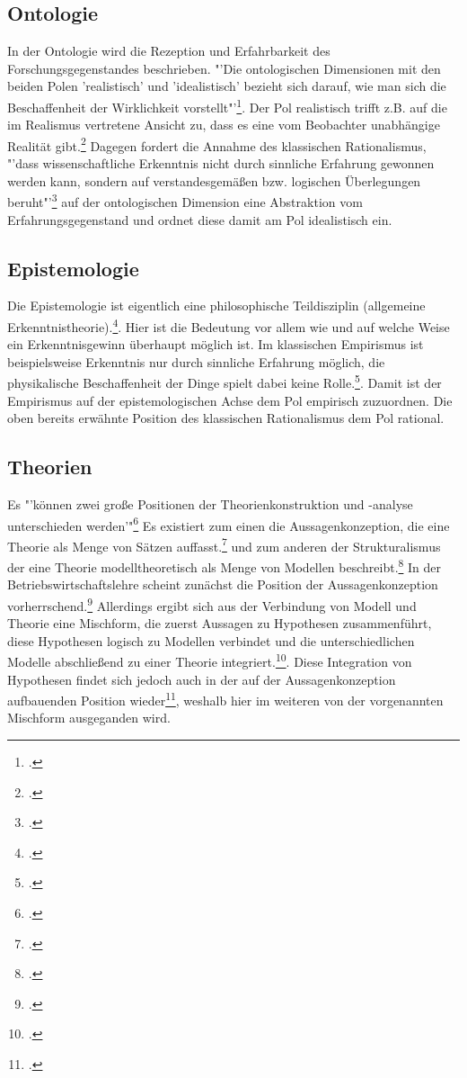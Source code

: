 \documentclass[a4paper,12pt]{article}
\begin{document}
\subsection{Ontologie}
In der Ontologie wird die Rezeption und Erfahrbarkeit des Forschungsgegenstandes beschrieben. "'Die ontologischen Dimensionen mit den beiden Polen 'realistisch' und 'idealistisch' bezieht sich darauf, wie man sich die Beschaffenheit  der Wirklichkeit vorstellt"'\footcite[S. 94]{Helfrich2024}. Der Pol realistisch trifft z.B. auf die im Realismus vertretene Ansicht zu, dass es eine vom Beobachter unabhängige Realität gibt.\footcite[S. 95]{Helfrich2024} Dagegen fordert die Annahme des klassischen Rationalismus, "'dass wissenschaftliche Erkenntnis nicht durch sinnliche Erfahrung gewonnen werden kann, sondern auf verstandesgemäßen bzw. logischen Überlegungen beruht"'\footcite[S. 100]{Helfrich2024} auf der ontologischen Dimension eine Abstraktion vom Erfahrungsgegenstand und ordnet diese damit am Pol idealistisch ein.
\subsection{Epistemologie}
Die Epistemologie ist eigentlich eine philosophische Teildisziplin (allgemeine Erkenntnistheorie).\footcite[S. 1]{Helfrich2024}. Hier ist die Bedeutung vor allem wie und auf welche Weise ein Erkenntnisgewinn überhaupt möglich ist. Im klassischen Empirismus ist beispielsweise Erkenntnis nur durch sinnliche Erfahrung möglich, die physikalische Beschaffenheit der Dinge spielt dabei keine Rolle.\footcite[S. 98]{Helfrich2024}. Damit ist der Empirismus auf der epistemologischen Achse dem Pol empirisch zuzuordnen. Die oben bereits erwähnte Position des klassischen Rationalismus dem Pol rational.
\subsection{Theorien}
Es "'können zwei große Positionen der Theorienkonstruktion und -analyse unterschieden werden'"\footcite[S. 100]{Kornmesser2020} Es existiert zum einen die Aussagenkonzeption, die eine Theorie als Menge von Sätzen auffasst.\footcite[S. 100]{Kornmesser2020} und zum anderen der Strukturalismus der eine Theorie modelltheoretisch als Menge von Modellen beschreibt.\footcite[S. 100]{Kornmesser2020} In der Betriebswirtschaftslehre scheint zunächst die Position der Aussagenkonzeption vorherrschend.\footcite[S. 61]{Helfrich2024} Allerdings ergibt sich aus der Verbindung von Modell und Theorie eine Mischform, die zuerst Aussagen zu Hypothesen zusammenführt, diese Hypothesen logisch zu Modellen verbindet und die unterschiedlichen Modelle abschließend zu einer Theorie integriert.\footcite[S. 84]{Kornmeier2007}. Diese Integration von Hypothesen findet sich jedoch auch in der auf der Aussagenkonzeption aufbauenden Position wieder\footcite[S. 63]{Helfrich2024}, weshalb hier im weiteren von der vorgenannten Mischform ausgeganden wird.
\end{document}
